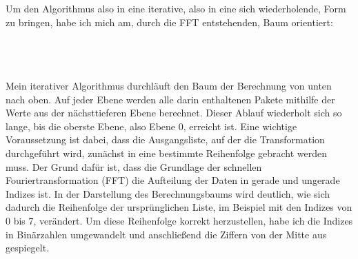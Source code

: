 \documentclass[a4paper,12pt]{article}
\theoremstyle{definition}
\theoremstyle{remark}
\begin{document}
Um den Algorithmus also in eine iterative, also in eine sich wiederholende, Form zu bringen, habe ich mich am, durch die 
FFT entstehenden, Baum orientiert:
\\\\  
\\\\
Mein iterativer Algorithmus durchläuft den Baum der Berechnung von unten nach oben. Auf jeder Ebene werden alle darin enthaltenen 
Pakete mithilfe der Werte aus der nächsttieferen Ebene berechnet. Dieser Ablauf wiederholt sich so lange, bis die oberste Ebene, 
also Ebene 0, erreicht ist. Eine wichtige Voraussetzung ist dabei, dass die Ausgangsliste, auf der die Transformation durchgeführt 
wird, zunächst in eine bestimmte Reihenfolge gebracht werden muss. Der Grund dafür ist, dass die Grundlage der schnellen Fouriertransformation 
(FFT) die Aufteilung der Daten in gerade und ungerade Indizes ist. In der Darstellung des Berechnungsbaums wird deutlich, wie sich 
dadurch die Reihenfolge der ursprünglichen Liste, im Beispiel mit den Indizes von 0 bis 7, verändert. Um diese Reihenfolge korrekt 
herzustellen, habe ich die Indizes in Binärzahlen umgewandelt und anschließend die Ziffern von der Mitte aus gespiegelt.
\\\\
\end{document}
